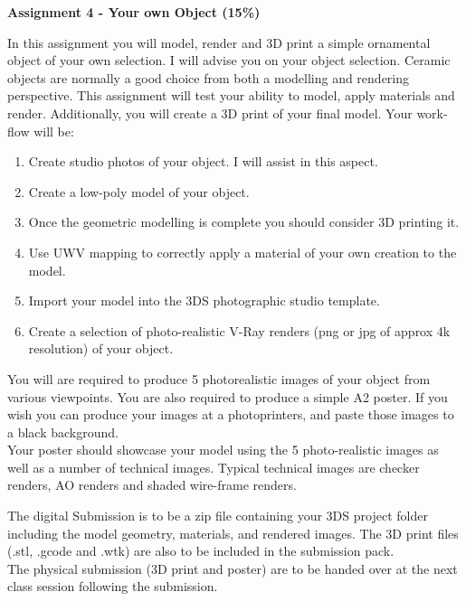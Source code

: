 

\begin{flushleft}
\Large\textbf{Assignment 4 - Your own Object (15\%)}\\
\end{flushleft}

In this assignment you will model, render and 3D print a simple ornamental object of your own selection.  I will advise you on your object selection.  Ceramic objects are normally a good choice from both a modelling and rendering perspective. This assignment will test your ability to model, apply materials and render.  Additionally, you will create a 3D print of your final model.  Your work-flow will be:
\begin{enumerate}
	\item Create studio photos of your object. I will assist in this aspect.
	\item Create a low-poly model of your object.
	\item Once the geometric modelling is complete you should consider 3D printing it.
	\item Use UWV mapping to correctly apply a material of your own creation to the model.
	\item Import your model into the 3DS photographic studio template.
	\item Create a selection of photo-realistic V-Ray renders (png or jpg of approx 4k resolution) of your object.
\end{enumerate}

You will are required to produce 5 photorealistic images of your object from various viewpoints.  You are also required to produce a simple A2 poster.  If you wish you can produce your images at a photoprinters, and paste those images to a black background.\\

Your poster should showcase your model using the 5 photo-realistic images as well as a number of technical images.  Typical technical images are checker renders, AO renders and shaded wire-frame renders. 

The digital Submission is to be a zip file containing your 3DS project folder including the model geometry, materials, and rendered images.  The 3D print files (.stl, .gcode and .wtk) are also to be included in the submission pack.  \\

The physical submission (3D print and poster) are to be handed over at the next class session following the submission.


